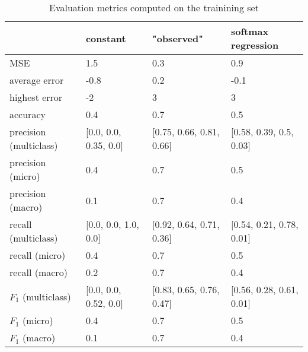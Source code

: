 \begin{table}[H]
\caption{Evaluation metrics computed on the trainining set}
\label{tbl:sais_eval_trainining}
\begin{tabular}{llll}
\toprule
 & constant & "observed" & softmax regression \\
\midrule
MSE & 1.5 & 0.3 & 0.9 \\
average error & -0.8 & 0.2 & -0.1 \\
highest error & -2 & 3 & 3 \\
accuracy & 0.4 & 0.7 & 0.5 \\
precision (multiclass) & [0.0, 0.0, 0.35, 0.0] & [0.75, 0.66, 0.81, 0.66] & [0.58, 0.39, 0.5, 0.03] \\
precision (micro) & 0.4 & 0.7 & 0.5 \\
precision (macro) & 0.1 & 0.7 & 0.4 \\
recall (multiclass) & [0.0, 0.0, 1.0, 0.0] & [0.92, 0.64, 0.71, 0.36] & [0.54, 0.21, 0.78, 0.01] \\
recall (micro) & 0.4 & 0.7 & 0.5 \\
recall (macro) & 0.2 & 0.7 & 0.4 \\
$F_1$ (multiclass) & [0.0, 0.0, 0.52, 0.0] & [0.83, 0.65, 0.76, 0.47] & [0.56, 0.28, 0.61, 0.01] \\
$F_1$ (micro) & 0.4 & 0.7 & 0.5 \\
$F_1$ (macro) & 0.1 & 0.7 & 0.4 \\
\bottomrule
\end{tabular}
\end{table}
